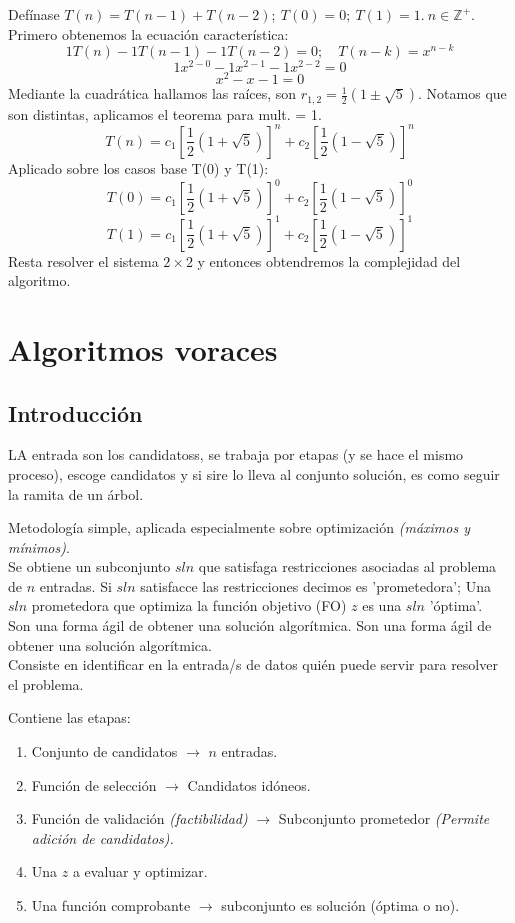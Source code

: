 \documentclass[tikz,11pt,fleqn]{book} %
\begin{document}
\begin{example}
	Defínase $T(n)=T(n-1)+T(n-2);~ T(0)=0;~ T(1)=1.~ n\in\mathbb{Z}^+$.\\
	Primero obtenemos la ecuación característica:
	$$ 1T(n)-1T(n-1)-1T(n-2)=0;\quad T(n-k)=x^{n-k} $$
	$$ 1x^{2-0}-1x^{2-1}-1x^{2-2}=0 $$
	$$ x^2-x-1=0 $$
	Mediante la cuadrática hallamos las raíces, son $r_{1,2}=\frac12(1\pm\sqrt5)$. Notamos que son distintas, aplicamos el teorema para mult. = 1.
	$$ T(n)=c_1[\frac12(1+\sqrt5)]^n+c_2[\frac12(1-\sqrt5)]^n $$
	Aplicado sobre los casos base T(0) y T(1):
	$$ T(0)=c_1[\frac12(1+\sqrt5)]^0+c_2[\frac12(1-\sqrt5)]^0 $$
	$$ T(1)=c_1[\frac12(1+\sqrt5)]^1+c_2[\frac12(1-\sqrt5)]^1 $$
	Resta resolver el sistema $2\times2$ y entonces obtendremos la complejidad del algoritmo.
\end{example}


\chapter{Algoritmos voraces}
\section{Introducción}
LA entrada son los candidatoss, se trabaja por etapas (y se hace el mismo proceso), escoge candidatos y si sire lo lleva al conjunto solución, es como seguir la ramita de un árbol.

Metodología simple, aplicada especialmente sobre optimización \textit{(máximos y mínimos)}.\\
Se obtiene un subconjunto $sln$ que satisfaga restricciones asociadas al problema de $n$ entradas. Si $sln$ satisfacce las restricciones decimos es 'prometedora'; Una $sln$ prometedora que optimiza la función objetivo (FO) $z$ es una $sln$ 'óptima'.
\\
Son una forma ágil de obtener una solución algorítmica.
Son una forma ágil de obtener una solución algorítmica.\\
Consiste en identificar en la entrada/s de datos quién puede servir para resolver el problema.
\\
\begin{definition}[Elementos]
	Contiene las etapas:

	\begin{enumerate}
		\item Conjunto de candidatos $\to$ $n$ entradas.
		\item Función de selección $\to$ Candidatos idóneos.
		\item Función de validación \textit{(factibilidad)} $\to$ Subconjunto prometedor \textit{(Permite adición de candidatos).}
		\item Una $z$ a evaluar y optimizar.
		\item Una función comprobante $\to$ subconjunto es solución (óptima o no).
	\end{enumerate}
\end{definition}
\end{document}
